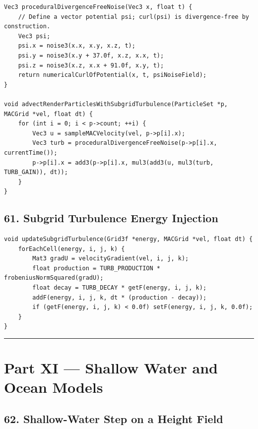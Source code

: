 \documentclass[10pt,letterpaper]{article}
\begin{document}
\begin{verbatim}
Vec3 proceduralDivergenceFreeNoise(Vec3 x, float t) {
    // Define a vector potential psi; curl(psi) is divergence-free by construction.
    Vec3 psi;
    psi.x = noise3(x.x, x.y, x.z, t);
    psi.y = noise3(x.y + 37.0f, x.z, x.x, t);
    psi.z = noise3(x.z, x.x + 91.0f, x.y, t);
    return numericalCurlOfPotential(x, t, psiNoiseField);
}

void advectRenderParticlesWithSubgridTurbulence(ParticleSet *p, MACGrid *vel, float dt) {
    for (int i = 0; i < p->count; ++i) {
        Vec3 u = sampleMACVelocity(vel, p->p[i].x);
        Vec3 turb = proceduralDivergenceFreeNoise(p->p[i].x, currentTime());
        p->p[i].x = add3(p->p[i].x, mul3(add3(u, mul3(turb, TURB_GAIN)), dt));
    }
}
\end{verbatim}

\subsection*{61. Subgrid Turbulence Energy Injection}

\begin{verbatim}
void updateSubgridTurbulence(Grid3f *energy, MACGrid *vel, float dt) {
    forEachCell(energy, i, j, k) {
        Mat3 gradU = velocityGradient(vel, i, j, k);
        float production = TURB_PRODUCTION * frobeniusNormSquared(gradU);
        float decay = TURB_DECAY * getF(energy, i, j, k);
        addF(energy, i, j, k, dt * (production - decay));
        if (getF(energy, i, j, k) < 0.0f) setF(energy, i, j, k, 0.0f);
    }
}
\end{verbatim}

\medskip\hrule\medskip

\clearpage
{}
\section*{Part XI --- Shallow Water and Ocean Models}

\subsection*{62. Shallow-Water Step on a Height Field}
\end{document}
